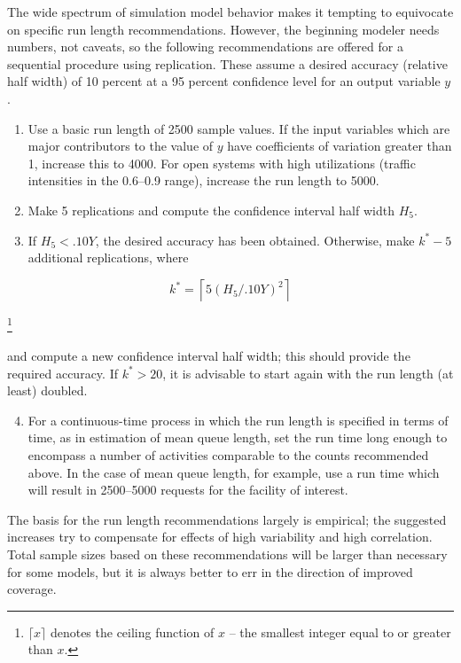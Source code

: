 The wide spectrum of simulation model behavior makes it tempting to
equivocate on specific run length recommendations. However, the beginning
modeler needs numbers, not caveats, so the following recommendations are
offered for a sequential procedure using replication. These assume a desired
accuracy (relative half width) of 10 percent at a 95 percent confidence level
for an output variable $y$.

\begin{enumerate}
\item Use a basic run length of 2500 sample values. If the input variables
  which are major contributors to the value of $y$ have coefficients of
  variation greater than 1, increase this to 4000. For open systems with high
  utilizations (traffic intensities in the 0.6--0.9 range), increase the run
  length to 5000.
\item Make 5 replications and compute the confidence interval half width
  $H_5$.
\item If $H_5 < .10Y$, the desired accuracy has been obtained. Otherwise, make
  $k^* - 5$ additional replications, where
\end{enumerate}

\begin{equation}
k^* = \left\lceil 5\left(H_5/.10Y\right)^2 \right\rceil
\label{eq:output-kstar}
\end{equation}

\footnote{$\lceil x \rceil$ denotes the ceiling function of $x$ -- the smallest
integer equal to or greater than $x$.}

and compute a new confidence interval half width; this should provide the
required accuracy. If $k^* > 20$, it is advisable to start again with the run
length (at least) doubled.

\begin{enumerate}
\setcounter{enumi}{3}
\item For a continuous-time process in which the run length is specified in
  terms of time, as in estimation of mean queue length, set the run time long
  enough to encompass a number of activities comparable to the counts
  recommended above. In the case of mean queue length, for example, use a run
  time which will result in 2500--5000 requests for the facility of interest.
\end{enumerate}

The basis for the run length recommendations largely is empirical; the
suggested increases try to compensate for effects of high variability and
high correlation. Total sample sizes based on these recommendations will be
larger than necessary for some models, but it is always better to err in the
direction of improved coverage.

